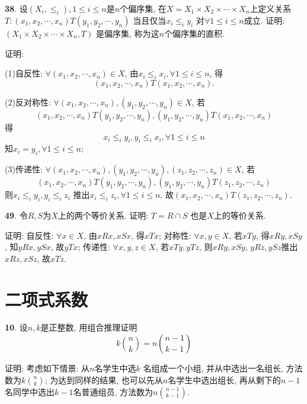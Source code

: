 \documentclass[12pt,a4paper]{article}
\begin{document}
\begin{CJK*}{GBK}{song}
\par \textbf{38}. 设$(X_i,\le_i),1\le i\le n$是$n$个偏序集, 在$X=X_1\times X_2 \times \cdots\times X_n$上定义关系$T:(x_1,x_2,\cdots,x_n)T(y_1,y_2,\cdots,y_n)$ 当且仅当$x_i\le_i y_i$ 对$\forall 1\le i\le n$成立. 证明: $(X_1\times X_2 \times \cdots\times X_n, T)$ 是偏序集, 称为这$n$个偏序集的直积.
\par 证明:
\par (1)自反性: $\forall (x_1,x_2,\cdots,x_n) \in X$, 由$x_i\le_i x_i, \forall 1\le i\le n$, 得
\begin{displaymath}
(x_1,x_2,\cdots,x_n)T(x_1,x_2,\cdots,x_n).
\end{displaymath}
\par (2)反对称性: $\forall (x_1,x_2,\cdots,x_n),(y_1,y_2,\cdots,y_n) \in X$, 若
\begin{displaymath}
(x_1,x_2,\cdots,x_n)T (y_1,y_2,\cdots,y_n),
(y_1,y_2,\cdots,y_n)T (x_1,x_2,\cdots,x_n)
\end{displaymath}
得
\begin{displaymath}
x_i \le_i y_i, y_i \le_i x_i, \forall 1\le i\le n
\end{displaymath}
知$x_i = y_i,\forall 1\le i\le n$;
\par (3)传递性: $\forall(x_1,x_2,\cdots,x_n),(y_1,y_2,\cdots,y_n),(z_1,z_2,\cdots,z_n) \in X$, 若
\begin{displaymath}
(x_1,x_2,\cdots,x_n)T(y_1,y_2,\cdots,y_n), (y_1,y_2,\cdots,y_n)T(z_1,z_2,\cdots,z_n)
\end{displaymath}
则$x_i\le_iy_i, y_i\le_iz_i$ 推出$x_i\le_iz_i,\forall 1\le i\le n$. 故$(x_1,x_2,\cdots,x_n)T(z_1,z_2,\cdots,z_n)$.

\par \textbf{49}. 令$R,S$为$X$上的两个等价关系. 证明: $T=R\cap S$ 也是$X$上的等价关系.
\par 证明: 自反性: $\forall x\in X$, 由$xRx, xSx$, 得$xTx$; 对称性: $\forall x,y \in X$, 若$xTy$, 得$xRy, xSy$, 知$yRx, ySx$, 故$yTx$; 传递性: $\forall x,y,z \in X$, 若$xTy, yTz$, 则$xRy, xSy$, $yRz, ySz$推出$xRz, xSz$, 故$xTz$.

\section{二项式系数}

\par \textbf{10}. 设$n,k$是正整数, 用组合推理证明
\begin{displaymath}
k\binom{n}{k}=n\binom{n-1}{k-1}
\end{displaymath}
\par 证明: 考虑如下情景: 从$n$名学生中选$k$ 名组成一个小组, 并从中选出一名组长, 方法数为$k\binom{n}{k}$; 为达到同样的结果, 也可以先从$n$名学生中选出组长, 再从剩下的$n-1$ 名同学中选出$k-1$名普通组员, 方法数为$n\binom{n-1}{k-1}$.


\end{CJK*}
\end{document}
